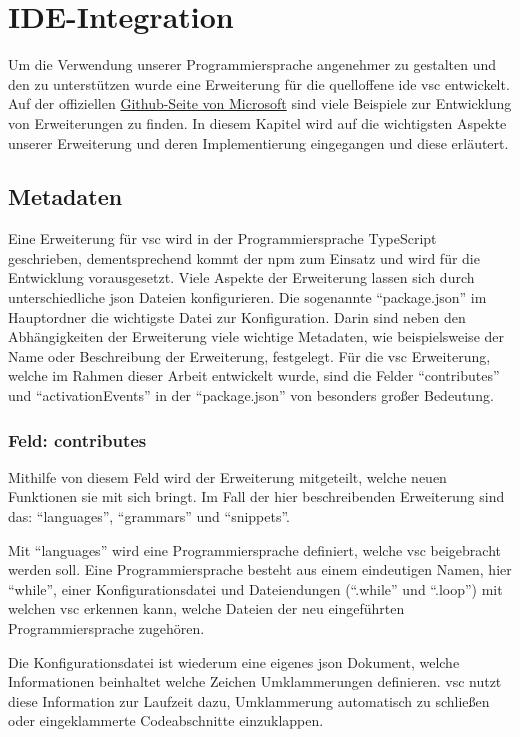\chapter{IDE-Integration} \label{chap:ide}
Um die Verwendung unserer Programmiersprache angenehmer zu gestalten und den zu unterstützen wurde eine Erweiterung für die quelloffene \acs{ide} \ac{vsc} entwickelt.
Auf der offiziellen \href{https://github.com/microsoft/vscode-extension-samples}{Github-Seite von Microsoft} sind viele Beispiele zur Entwicklung von Erweiterungen zu finden. \cite{MicrosoftCorporation2022}
In diesem Kapitel wird auf die wichtigsten Aspekte unserer Erweiterung und deren Implementierung eingegangen und diese erläutert. 


\section{Metadaten}
Eine Erweiterung für \ac{vsc} wird in der Programmiersprache TypeScript geschrieben, dementsprechend kommt der \ac{npm} zum Einsatz und wird für die Entwicklung vorausgesetzt.
Viele Aspekte der Erweiterung lassen sich durch unterschiedliche \ac{json} Dateien konfigurieren. 
Die sogenannte \enquote{package.json} im Hauptordner die wichtigste Datei zur Konfiguration.
Darin sind neben den Abhängigkeiten der Erweiterung viele wichtige Metadaten, wie beispielsweise der Name oder Beschreibung der Erweiterung, festgelegt.
Für die \ac{vsc} Erweiterung, welche im Rahmen dieser Arbeit entwickelt wurde, sind die Felder \enquote{contributes} und \enquote{activationEvents} in der \enquote{package.json} von besonders großer Bedeutung. 

\subsection{Feld: contributes}
Mithilfe von diesem Feld wird der Erweiterung mitgeteilt, welche neuen Funktionen sie mit sich bringt.
Im Fall der hier beschreibenden Erweiterung sind das: \enquote{languages}, \enquote{grammars} und \enquote{snippets}. 

Mit \enquote{languages} wird eine Programmiersprache definiert, welche \ac{vsc} beigebracht werden soll.
Eine Programmiersprache besteht aus einem eindeutigen Namen, hier \enquote{while}, einer Konfigurationsdatei und Dateiendungen (\enquote{.while} und \enquote{.loop}) mit welchen \ac{vsc} erkennen kann, welche Dateien der neu eingeführten Programmiersprache zugehören.

Die Konfigurationsdatei ist wiederum eine eigenes \ac{json} Dokument, welche Informationen beinhaltet welche Zeichen Umklammerungen definieren. \ac{vsc} nutzt diese Information zur Laufzeit dazu, Umklammerung automatisch zu schließen oder eingeklammerte Codeabschnitte einzuklappen.

